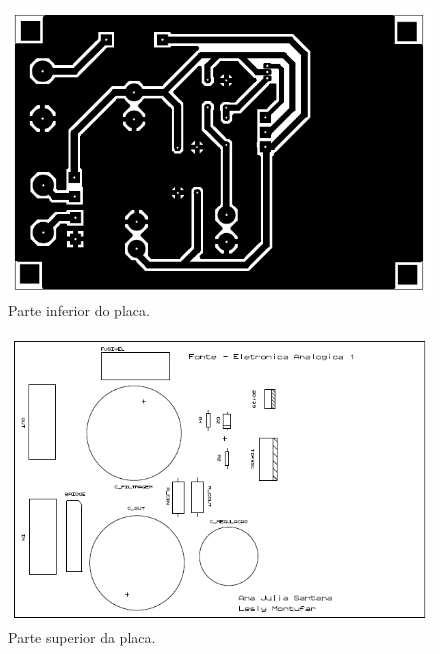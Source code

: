 \documentclass[a4paper,12pt,oneside,openany,table,xcdraw]{article}
\begin{document}
\begin{figure}[H]
\centering
\captionsetup{font=scriptsize}
\includegraphics[width=16cm]{bottom}
\caption{Parte inferior do placa.}
\label{bottom}
\end{figure}

\begin{figure}[H]
\centering
\captionsetup{font=scriptsize}
\includegraphics[width=16cm]{top}
\caption{Parte superior da placa.}
\label{top}
\end{figure}
\end{document}
